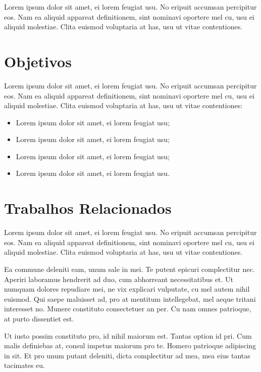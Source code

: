 		Lorem ipsum dolor sit amet, ei lorem feugiat usu. No eripuit accumsan percipitur eos. Nam ea aliquid appareat definitionem, sint nominavi oportere mel cu, usu ei aliquid molestiae. Clita euismod voluptaria at has, usu ut vitae contentiones.

	\section{Objetivos}
	\label{sec:objetivos}

		Lorem ipsum dolor sit amet, ei lorem feugiat usu. No eripuit accumsan percipitur eos. Nam ea aliquid appareat definitionem, sint nominavi oportere mel cu, usu ei aliquid molestiae. Clita euismod voluptaria at has, usu ut vitae contentiones:

		\begin{itemize}
			\item Lorem ipsum dolor sit amet, ei lorem feugiat usu;
			\item Lorem ipsum dolor sit amet, ei lorem feugiat usu;
			\item Lorem ipsum dolor sit amet, ei lorem feugiat usu;
			\item Lorem ipsum dolor sit amet, ei lorem feugiat usu.
		\end{itemize}

	\section{Trabalhos Relacionados}
	\label{sec:trabalhos-relacionados}

		Lorem ipsum dolor sit amet, ei lorem feugiat usu. No eripuit accumsan percipitur eos. Nam ea aliquid appareat definitionem, sint nominavi oportere mel cu, usu ei aliquid molestiae. Clita euismod voluptaria at has, usu ut vitae contentiones.

		Ea commune deleniti eam, unum sale in mei. Te putent epicuri complectitur nec. Aperiri laboramus hendrerit ad duo, cum abhorreant necessitatibus et. Ut numquam dolores repudiare mei, ne vix explicari vulputate, cu mel autem nihil euismod. Qui saepe maluisset ad, pro at mentitum intellegebat, mel aeque tritani interesset no. Munere constituto consectetuer an per. Cu nam omnes patrioque, at purto dissentiet est.

		Ut iusto possim constituto pro, id nihil maiorum est. Tantas option id pri. Cum malis definiebas at, consul impetus maiorum pro te. Homero patrioque adipiscing in sit. Et pro unum putant deleniti, dicta complectitur ad mea, mea eius tantas tacimates eu.

